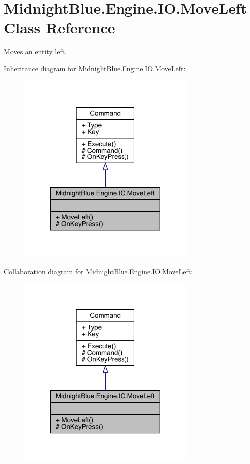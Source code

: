 \hypertarget{class_midnight_blue_1_1_engine_1_1_i_o_1_1_move_left}{}\section{Midnight\+Blue.\+Engine.\+I\+O.\+Move\+Left Class Reference}
\label{class_midnight_blue_1_1_engine_1_1_i_o_1_1_move_left}


Moves an entity left.  




Inheritance diagram for Midnight\+Blue.\+Engine.\+I\+O.\+Move\+Left\+:
\nopagebreak
\begin{figure}[H]
\begin{center}
\leavevmode
\includegraphics[width=245pt]{class_midnight_blue_1_1_engine_1_1_i_o_1_1_move_left__inherit__graph}
\end{center}
\end{figure}


Collaboration diagram for Midnight\+Blue.\+Engine.\+I\+O.\+Move\+Left\+:
\nopagebreak
\begin{figure}[H]
\begin{center}
\leavevmode
\includegraphics[width=245pt]{class_midnight_blue_1_1_engine_1_1_i_o_1_1_move_left__coll__graph}
\end{center}
\end{figure}

